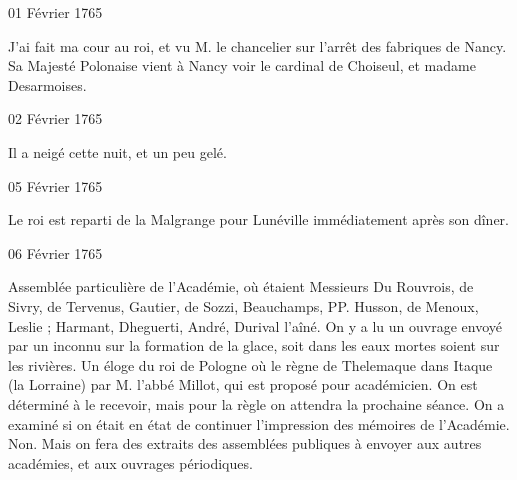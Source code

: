                      
                     
                     \begin{diary}{01 Février 1765}{}
                        
                         J'ai fait ma cour au roi, et vu M.
                              le chancelier sur l'arrêt des fabriques
                              de Nancy. Sa Majesté Polonaise vient à Nancy
                           voir le cardinal de Choiseul, et madame Desarmoises. \bigskip
        
        
                     \end{diary}
                     \begin{diary}{02 Février 1765}{}
                        
                        
                           Il a neigé cette nuit, et un peu gelé. \bigskip
        
        
                     \end{diary}

                     \begin{diary}{05 Février 1765}{}
                        
                        
                           Le roi est reparti de
                              la Malgrange pour Lunéville
                           immédiatement après son dîner. \bigskip
        
        
                     \end{diary}

                     \begin{diary}{06 Février 1765}{}
                        
                         Assemblée particulière de l'Académie, où étaient
                           Messieurs
                           Du Rouvrois, de Sivry, de
                           Tervenus, Gautier,
                           de Sozzi, Beauchamps, PP. Husson, de Menoux,
                              Leslie ;
                           Harmant, Dheguerti, André, Durival
                              l'aîné.
                           On y a lu un ouvrage envoyé par
                           un inconnu
                           sur la formation de la glace, soit dans les eaux mortes
                           soient sur les rivières. Un éloge du
                                 roi de Pologne où
                              le règne de Thelemaque dans Itaque (la Lorraine)
                           par M. l'abbé Millot, qui est
                           proposé pour
                           académicien. On est déterminé à le recevoir,
                           mais pour la règle on attendra la prochaine séance.
                           On a examiné si on était en état de continuer
                           l'impression des mémoires de l'Académie.
                           Non. Mais on fera des extraits des assemblées
                           publiques à envoyer aux autres académies,
                           et aux ouvrages périodiques. \bigskip
        
        
                     \end{diary}

